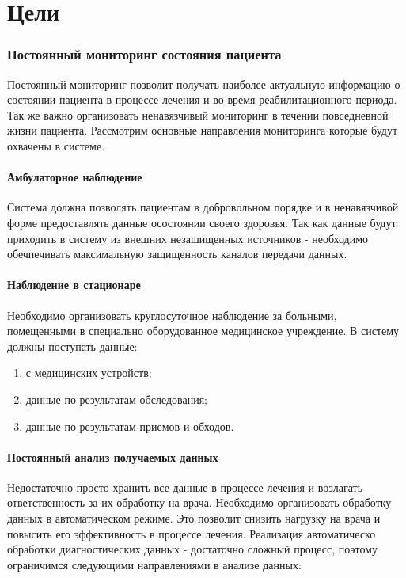 \newpage
\chapter{Цели}
\subsection{Постоянный мониторинг состояния пациента	}

Постоянный мониторинг позволит получать наиболее актуальную информацию о
состоянии пациента в процессе лечения и во время реабилитационного периода. Так
же важно организовать ненавязчивый мониторинг в течении повседневной жизни
пациента. Рассмотрим основные направления мониторинга которые будут охвачены в
системе.

\subsubsection{Амбулаторное наблюдение}

Система должна позволять пациентам в добровольном порядке и в ненавязчивой форме
предоставлять данные осостоянии своего здоровья. Так как данные будут приходить
в систему из внешних незашищенных источников - необходимо обечпечивать
максимальную защищенность каналов передачи данных.

\subsubsection{Наблюдение в стационаре}

Необходимо организовать круглосуточное наблюдение за больными, помещенными в
специально оборудованное медицинское учреждение. В систему должны поступать
данные:

\begin{enumerate}
	\item с медицинских устройств;
	\item данные по результатам обследования;
	\item данные по результатам приемов и обходов.
\end{enumerate}

\subsubsection{Постоянный анализ получаемых данных}

Недостаточно просто хранить все данные в процессе лечения и возлагать
ответственность за их обработку на врача. Необходимо организовать обработку
данных в автоматическом режиме. Это позволит снизить нагрузку на врача и
повысить его эффективность в процессе лечения.
Реализация автоматическо обработки диагностических данных - достаточно сложный
процесс, поэтому ограничимся следующими направлениями в анализе данных:

